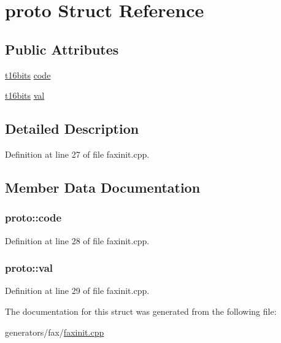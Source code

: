 \hypertarget{structproto}{\section{proto Struct Reference}
\label{structproto}
}
\subsection*{Public Attributes}
\begin{DoxyCompactItemize}
\item 
\hyperlink{faxexpand_8h_adbe0cc2e2aa9b9127df55d505f059631}{t16bits} \hyperlink{structproto_aa0b2123c60b611d7eb61320bb0e44d8a}{code}
\item 
\hyperlink{faxexpand_8h_adbe0cc2e2aa9b9127df55d505f059631}{t16bits} \hyperlink{structproto_a94966c5a4b87dea8bdaa3d1799250980}{val}
\end{DoxyCompactItemize}


\subsection{Detailed Description}


Definition at line 27 of file faxinit.\+cpp.



\subsection{Member Data Documentation}
\hypertarget{structproto_aa0b2123c60b611d7eb61320bb0e44d8a}{
\subsubsection[{code}]{ proto\+::code}}\label{structproto_aa0b2123c60b611d7eb61320bb0e44d8a}


Definition at line 28 of file faxinit.\+cpp.

\hypertarget{structproto_a94966c5a4b87dea8bdaa3d1799250980}{
\subsubsection[{val}]{ proto\+::val}}\label{structproto_a94966c5a4b87dea8bdaa3d1799250980}


Definition at line 29 of file faxinit.\+cpp.



The documentation for this struct was generated from the following file\+:\begin{DoxyCompactItemize}
\item 
generators/fax/\hyperlink{faxinit_8cpp}{faxinit.\+cpp}\end{DoxyCompactItemize}
